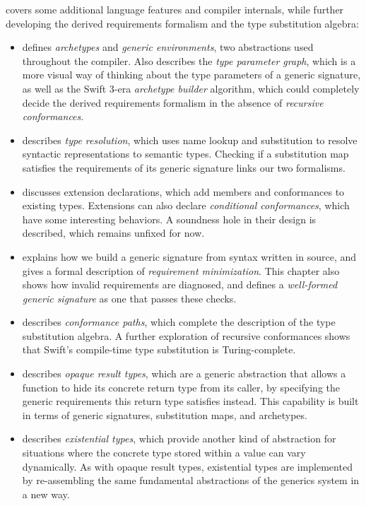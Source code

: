 \documentclass[../generics]{subfiles}
\begin{document}
 covers some additional language features and compiler internals, while further developing the derived requirements formalism and the type substitution algebra:
\begin{itemize}
\item {} defines \emph{archetypes} and \emph{generic environments}, two abstractions used throughout the compiler. Also describes the \emph{type parameter graph}, which is a more visual way of thinking about the type parameters of a generic signature, as well as the Swift 3-era \emph{archetype builder} algorithm, which could completely decide the derived requirements formalism in the absence of \emph{recursive conformances}.

\item {} describes \emph{type resolution}, which uses name lookup and substitution to resolve syntactic representations to semantic types. Checking if a substitution map satisfies the requirements of its generic signature links our two formalisms.

\item {} discusses extension declarations, which add members and conformances to existing types. Extensions can also declare \emph{conditional conformances}, which have some interesting behaviors. A soundness hole in their design is described, which remains unfixed for now.

\item {} explains how we build a generic signature from syntax written in source, and gives a formal description of \emph{requirement minimization}. This chapter also shows how invalid requirements are diagnosed, and defines a \emph{well-formed generic signature} as one that passes these checks.

\item {} describes \emph{conformance paths}, which complete the description of the type substitution algebra. A further exploration of recursive conformances shows that Swift's compile-time type substitution is Turing-complete.

\item {} describes \emph{opaque result types}, which are a generic abstraction that allows a function to hide its concrete return type from its caller, by specifying the generic requirements this return type satisfies instead. This capability is built in terms of generic signatures, substitution maps, and archetypes.

\item {} describes \emph{existential types}, which provide another kind of abstraction for situations where the concrete type stored within a value can vary dynamically. As with opaque result types, existential types are implemented by re-assembling the same fundamental abstractions of the generics system in a new way.
\end{itemize}
\end{document}
